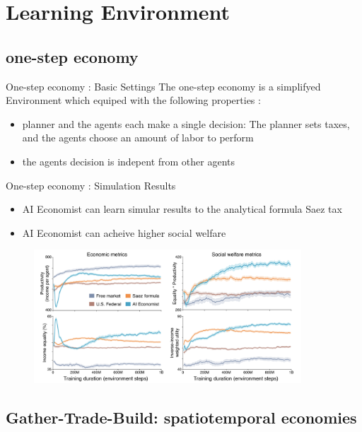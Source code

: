 \documentclass{beamer}
\begin{document}
    \section{Learning Environment}

        \subsection{one-step economy}

        \begin{frame}{One-step economy : Basic Settings}
            The one-step economy is a simplifyed Environment which equiped with
            the following properties : 
            \begin{itemize}
                \item planner and the agents each make a
            single decision: The planner sets taxes, and the agents choose an
            amount of labor to perform
                \item the agents decision is indepent from other agents
            \end{itemize}

        \end{frame}

        \begin{frame}{One-step economy : Simulation Results}
            \begin{itemize}
                \item AI Economist can learn simular results to the analytical formula Saez tax
                \item AI Economist can acheive higher social welfare
            \end{itemize}
            \begin{figure}[h]
                \includegraphics[width=10cm]{./img/pic2.png}
            \end{figure}
        \end{frame}

        \subsection{Gather-Trade-Build: spatiotemporal
    economies}
\end{document}
